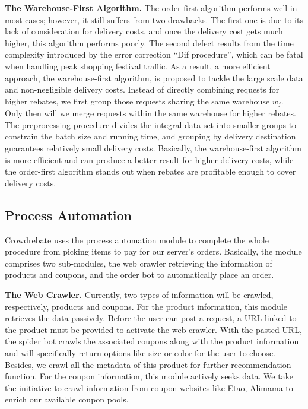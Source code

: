 \textbf{The Warehouse-First Algorithm.} The order-first algorithm performs well in most cases; however, it still suffers from two drawbacks. The first one is due to its lack of consideration for delivery costs, and once the delivery cost gets much higher, this algorithm performs poorly. The second defect results from the time complexity introduced by the error correction ``Dif procedure'', which can be fatal when handling peak shopping festival traffic. As a result, a more efficient approach, the warehouse-first algorithm, is proposed to tackle the large scale data and non-negligible delivery costs. Instead of directly combining requests for higher rebates, we first group those requests sharing the same warehouse $w_j$. Only then will we merge requests within the same warehouse for higher rebates. The preprocessing procedure divides the integral data set into smaller groups to constrain the batch size and running time, and grouping by delivery destination guarantees relatively small delivery costs. Basically, the warehouse-first algorithm is more efficient and can produce a better result for higher delivery costs, while the order-first algorithm stands out when rebates are profitable enough to cover delivery costs.

\subsection{Process Automation}

Crowdrebate uses the process automation module to complete the whole procedure from picking items to pay for our server's orders. Basically, the module comprises two sub-modules, the web crawler retrieving the information of products and coupons, and the order bot to automatically place an order. 

\textbf{The Web Crawler.} Currently, two types of information will be crawled, respectively, products and coupons. For the product information, this module retrieves the data passively. Before the user can post a request, a URL linked to the product must be provided to activate the web crawler. With the pasted URL, the spider bot crawls the associated coupons along with the product information and will specifically return options like size or color for the user to choose. Besides, we crawl all the metadata of this product for further recommendation function. For the coupon information, this module actively seeks data. We take the initiative to crawl information from coupon websites like Etao, Alimama to enrich our available coupon pools. 

